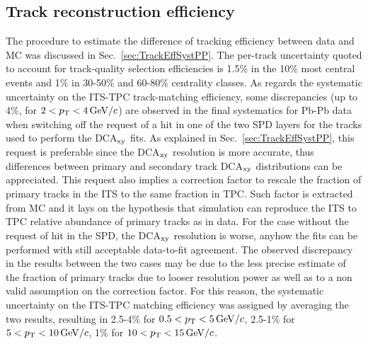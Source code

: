 \subsection{Track reconstruction efficiency}
\label{sec:TrackEffSystPbPb}
The procedure to estimate the difference
of tracking efficiency between data and MC was discussed in Sec.~\ref{sec:TrackEffSystPP}.
The per-track uncertainty quoted to account for track-quality selection efficiencies
is 1.5\% in the 10\% most central events and 1\% in 30-50\% and 60-80\% 
centrality classes. As regards the systematic uncertainty on the ITS-TPC 
track-matching efficiency, some discrepancies (up to 4\%, for $2 < p_{\rm T} < 4\, \mathrm{GeV}/c$) 
are observed in the final systematics for Pb-Pb data
when switching off the request of a hit in one of the two SPD 
layers for the tracks used to perform the DCA$_{\rm xy}$ fits.
As explained in Sec.~\ref{sec:TrackEffSystPP}, this request is 
preferable since the DCA$_{\rm xy}$
resolution is more accurate, thus differences between primary and secondary track DCA$_{\rm xy}$ 
distributions can be appreciated. This request also implies 
a correction factor to rescale the fraction of primary tracks in the ITS
to the same fraction in TPC. Such factor is extracted from MC and it
lays on the hypothesis that simulation can reproduce the ITS to TPC 
relative abundance of primary tracks 
as in data. For the case 
without the request of hit in the SPD, the DCA$_{\rm xy}$
resolution is worse, anyhow the fits can be performed with still acceptable data-to-fit agreement.
The observed discrepancy in the results between the two cases 
may be due to the less precise estimate
of the fraction of primary tracks due to looser resolution power as well as
to a non valid assumption on the correction factor. For this reason, the systematic 
uncertainty on the ITS-TPC matching efficiency was
assigned by averaging the two results, resulting in
2.5-4\% for $0.5 < p_{\rm T} < 5 \, \mathrm{GeV}/c$, 2.5-1\% for $5 < p_{\rm T} < 10 \, \mathrm{GeV}/c$, 1\% for $10 < p_{\rm T} < 15\, \mathrm{GeV}/c$.


